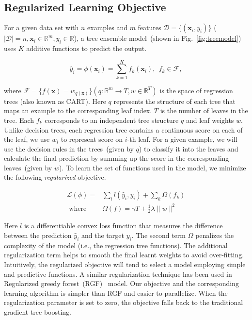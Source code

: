 \subsection{Regularized Learning Objective}\label{subsec:obj}

For a given data set with $n$ examples and $m$ features $\mathcal{D} = \{(\mathbf{x}_i, y_i)\}$ ($|\mathcal{D}| = n, \mathbf{x}_i\in \mathbb{R}^m, y_i \in \mathbb{R}$), a tree ensemble model~(shown in Fig.~\ref{fig:treemodel}) uses $K$ additive functions to predict the output.

\begin{equation}
\hat{y}_i = \phi(\mathbf{x}_i) = \sum^K_{k=1} f_k(\mathbf{x}_i), \ \ f_k\in \mathcal{F},
\end{equation}

where $\mathcal{F}=\{f(\mathbf{x}) = w_{q(\mathbf{x})}\} ( q : \mathbb{R}^m \rightarrow T, w\in \mathbb{R}^T) $ is the space of regression trees (also known as CART). Here $q$ represents the structure of each tree that maps an example to the corresponding leaf index.  $T$ is the number of leaves in the tree. Each $f_k$ corresponds to an independent tree structure $q$ and leaf weights $w$. Unlike decision trees, each regression tree contains a continuous score on each of the leaf, we use $w_i$ to represent score on $i$-th leaf. For a given example, we will use the decision rules in the trees~(given by $q$) to classify it into the leaves and calculate the final prediction by summing up the score in the corresponding leaves~(given by $w$). To learn the set of functions used in the model, we minimize the following \emph{regularized} objective.

\begin{equation}\label{eq:loss}
\begin{split}
\mathcal{L}(\phi) =& \sum_{i} l( \hat{y}_i, y_i ) + \sum_{k}\Omega( f_{k} ) \\
 \mbox{ where }& \Omega(f) = \gamma T + \frac{1}{2} \lambda \|w\|^2
 \end{split}
\end{equation}

Here $l$ is a differentiable convex loss function that measures the difference between the prediction $\hat{y}_i$ and the target $y_i$. The second term $\Omega$ penalizes the complexity of the model (i.e., the regression tree functions). The additional regularization term helps to smooth the final learnt weights to avoid over-fitting. Intuitively, the regularized objective will tend to select a model employing simple and predictive functions. A similar regularization technique has been used in Regularized greedy forest~(RGF)~\cite{Tong:RGF} model. Our objective and the corresponding learning algorithm is simpler than RGF and easier to parallelize. When the regularization parameter is set to zero, the objective falls back to the traditional gradient tree boosting.

